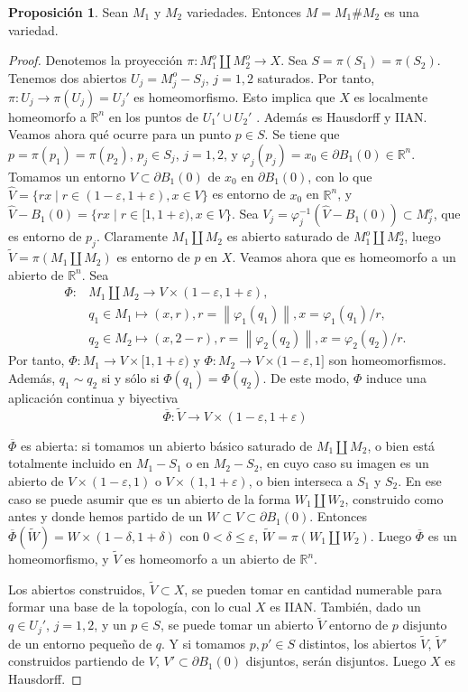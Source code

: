 \documentclass[10pt]{report}
\newcommand{\R}{\mathbb{R}}
\newcommand{\norm}[1]{\left\lVert#1\right\rVert} %
\theoremstyle{definition}
\newtheorem{prop}[defin]{Proposición}
\begin{document}
\begin{prop}%
Sean $M_1$ y $M_2$ variedades. Entonces $M=M_1\#M_2$ es una variedad.
\end{prop}
\begin{proof}
Denotemos la proyección $\pi:M_1^o\amalg M_2^o\to X$. Sea $S=\pi (S_1)=\pi (S_2)$. Tenemos dos abiertos $U_j=M_j^o-S_j$, $j=1,2$ saturados. Por tanto, $\pi :U_ j\to \pi (U_j)=U_j'$ es homeomorfismo. Esto implica que $X$ es localmente homeomorfo a  $\R^n$ en los puntos de $U_1'\cup U_2'$ . Además es Hausdorff y IIAN.
Veamos ahora qué ocurre para un punto $p\in S$. Se tiene que $p=\pi (p_1)=\pi (p_2)$, $p_j\in S_j$, $j=1,2$, y $\varphi_j(p_j)=x_0 \in \partial B_1(0) \in \R^n$. Tomamos un entorno $V\subset \partial B_1(0)$ de $x_0$ en $\partial B_1(0)$, con lo que $\hat{V}=\{rx\mid   r\in (1-\varepsilon , 1+\varepsilon ), x\in V\}$ es entorno de $x_0$ en $\R^n$, y $\hat{V}-B_1(0)=\{rx\mid r\in [1, 1+\varepsilon ), x \in V\}$. Sea $V_j=\varphi_j^{-1}(\hat{V}-B_1(0))\subset M_j^o$, que es entorno de $p_j$. Claramente $ M_1\amalg M_2$ es abierto saturado de $M_1^o\amalg M_2^o$, luego $\tilde{V}=\pi ( M_1\amalg M_2)$ es entorno de $p$ en $X$. Veamos ahora que es homeomorfo a un abierto de $\R^n$. Sea
\begin{align*}
\Phi : &  M_1\amalg M_2  \to  V\times (1-\varepsilon , 1+ \varepsilon ), \\
& q_1\in  M_1  \mapsto  (x,r), r=\norm{\varphi_1(q_1)}, x=\varphi_1(q_1)/r,\\
& q_2\in M_2  \mapsto  (x,2-r), r= \norm{\varphi_2(q_2)}, x= \varphi_2(q_2)/r.
\end{align*}
Por tanto, $\Phi :  M_1 \to V \times [1, 1+\varepsilon)$ y $\Phi : M_2 \to V \times (1- \varepsilon, 1]$ son homeomorfismos. Además, $q_1 \sim q_2$ si y sólo si $\Phi(q_1)=\Phi(q_2)$. De este modo, $\Phi$ induce una aplicación continua y biyectiva $$\overline{\Phi} : \tilde{V} \to V \times (1- \varepsilon, 1+ \varepsilon)$$

$\overline{\Phi}$ es abierta: si tomamos un abierto básico saturado de $ M_1\amalg M_2$, o bien está totalmente incluido en $ M_1-S_1$ o en $M_2-S_2$, en cuyo caso su imagen es un abierto de $V\times (1-\varepsilon ,1)$ o $V\times (1,1+\varepsilon )$, o bien interseca a $S_1$ y $S_2$. En ese caso se puede asumir que es un abierto de la forma $W_1\amalg W_2$, construido como antes y donde hemos partido de un $W\subset V \subset \partial B_1(0)$. Entonces $\overline{\Phi} (\tilde{W})= W \times (1-\delta , 1+\delta )$ con $0<\delta \leq \varepsilon$, $\tilde{W} = \pi (W_1 \amalg W_2)$. Luego $\overline{\Phi}$ es un homeomorfismo, y $\tilde{V}$ es homeomorfo a un abierto de $\R^n$.

Los abiertos construidos, $\tilde{V} \subset X$, se pueden tomar en cantidad numerable para formar una base de la topología, con lo cual $X$ es IIAN. También, dado un $q\in U_j'$, $j=1,2$, y un $p\in S$, se puede tomar un abierto $\tilde{V}$ entorno de $p$ disjunto de un entorno pequeño de $q$. Y si tomamos $p, p' \in S$ distintos, los abiertos $\tilde{V}$, $\tilde{V}'$ construidos partiendo de $V$, $V'\subset \partial B_1(0)$ disjuntos, serán disjuntos. Luego $X$ es Hausdorff.
\end{proof}
\end{document}
